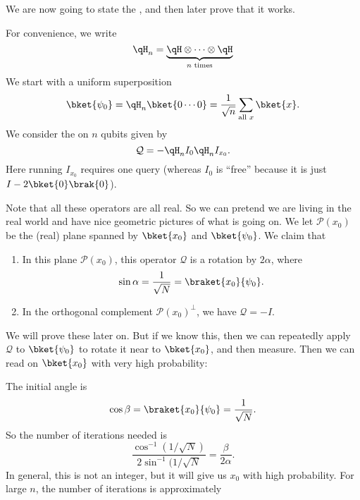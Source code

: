 \documentclass[a4paper]{article}
\begin{document}
We are now going to state the , and then later prove that it works.

For convenience, we write
\[
  \qH_n = \underbrace{\qH \otimes \cdots \otimes \qH}_{n\text{ times}}
\]
We start with a uniform superposition
\[
  \bket{\psi_0} = \qH_n \bket{0\cdots0} = \frac{1}{\sqrt{n}} \sum_{\text{all }x} \bket{x}.
\]
We consider the  on $n$ qubits given by
\[
  \mathcal{Q} = -\qH_n I_0 \qH_n I_{x_0}.
\]
Here running $I_{x_0}$ requires one query (whereas $I_0$ is ``free'' because it is just $I - 2 \bket{0}\brak{0}$).

Note that all these operators are all real. So we can pretend we are living in the real world and have nice geometric pictures of what is going on. We let $\mathcal{P}(x_0)$ be the (real) plane spanned by $\bket{x_0}$ and $\bket{\psi_0}$. We claim that
\begin{enumerate}
  \item In this plane $\mathcal{P}(x_0)$, this operator $\mathcal{Q}$ is a rotation by $2\alpha$, where
    \[
      \sin\alpha = \frac{1}{\sqrt{N}} = \braket{x_0}{\psi_0}.
    \]
  \item In the orthogonal complement $\mathcal{P}(x_0)^\perp$, we have $\mathcal{Q} = -I$.
\end{enumerate}
We will prove these later on. But if we know this, then we can repeatedly apply $\mathcal{Q}$ to $\bket{\psi_0}$ to rotate it near to $\bket{x_0}$, and then measure. Then we can read on $\bket{x_0}$ with very high probability:
\begin{center}
\end{center}
The initial angle is
\[
  \cos \beta = \braket{x_0}{\psi_0} = \frac{1}{\sqrt{N}}.
\]
So the number of iterations needed is
\[
  \frac{\cos^{-1}(1/\sqrt{N})}{2 \sin^{-1}(1/\sqrt{N}} = \frac{\beta}{2\alpha}.
\]
In general, this is not an integer, but it will give us $x_0$ with high probability. For large $n$, the number of iterations is approximately
\end{document}
